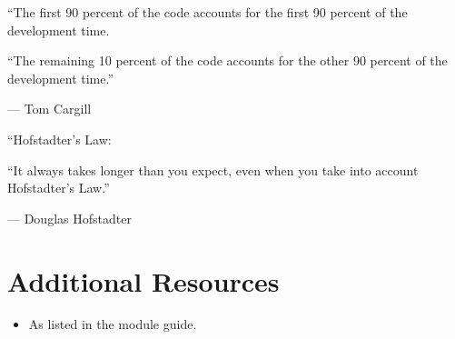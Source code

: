 \documentclass{../fal_assignment}
\begin{document}
\begin{marginquote}
    ``The first 90 percent of the code accounts for the first 90 percent of the development time.
    
    ``The remaining 10 percent of the code accounts for the other 90 percent of the development time.''
    
    --- Tom Cargill
    
    \marginquoterule
    
    ``Hofstadter's Law:
    
    ``It always takes longer than you expect, even when you take into account Hofstadter's Law.''
    
    --- Douglas Hofstadter
\end{marginquote}
\section*{Additional Resources}

\begin{itemize}
    \item As listed in the module guide.
\end{itemize}
\end{document}
